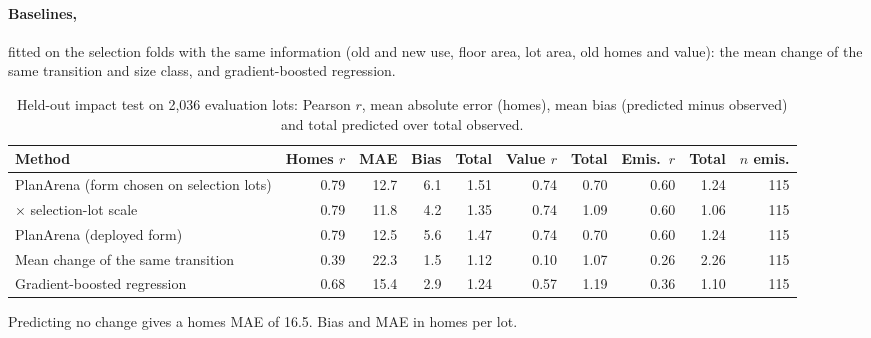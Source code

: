 \documentclass[10pt]{article}
\begin{document}
\paragraph{Baselines,} fitted on the selection folds with the same information (old and new use, floor area, lot
area, old homes and value): the mean change of the same transition and size class, and gradient-boosted regression.

\begin{table}[t]
\centering
\footnotesize
\setlength{\tabcolsep}{3pt}
\caption{Held-out impact test on 2{,}036 evaluation lots: Pearson $r$, mean absolute error (homes), mean bias (predicted minus observed) and total predicted over total observed.}
\label{tab:s-ih}
\begin{tabular}{lrrrrrrrrr}
\toprule
Method & Homes $r$ & MAE & Bias & Total & Value $r$ & Total & Emis.\ $r$ & Total & $n$ emis. \\
\midrule
PlanArena (form chosen on selection lots) & 0.79 & 12.7 & 6.1 & 1.51 & 0.74 & 0.70 & 0.60 & 1.24 & 115 \\
\quad $\times$ selection-lot scale & 0.79 & 11.8 & 4.2 & 1.35 & 0.74 & 1.09 & 0.60 & 1.06 & 115 \\
PlanArena (deployed form) & 0.79 & 12.5 & 5.6 & 1.47 & 0.74 & 0.70 & 0.60 & 1.24 & 115 \\
Mean change of the same transition & 0.39 & 22.3 & 1.5 & 1.12 & 0.10 & 1.07 & 0.26 & 2.26 & 115 \\
Gradient-boosted regression & 0.68 & 15.4 & 2.9 & 1.24 & 0.57 & 1.19 & 0.36 & 1.10 & 115 \\
\bottomrule
\end{tabular}
\par\smallskip
\begin{minipage}{0.95\linewidth}\footnotesize Predicting no change gives a homes MAE of 16.5. Bias and MAE in homes per lot.\end{minipage}
\end{table}
\end{document}
